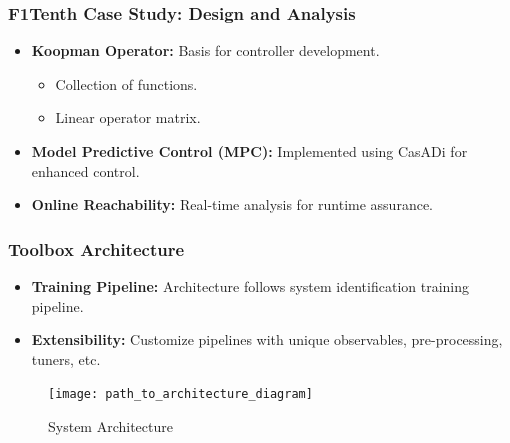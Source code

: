 \documentclass[shortpres,aspectratio=43]{beamer}
\begin{document}
\begin{frame}
\frametitle{F1Tenth Case Study: Design and Analysis}
\begin{itemize}
    \item<1-> \textbf{Koopman Operator:} Basis for controller development.
    \begin{itemize}
        \item Collection of functions.
        \item Linear operator matrix.
    \end{itemize}
    \item<2-> \textbf{Model Predictive Control (MPC):} Implemented using CasADi for enhanced control.
    \item<3-> \textbf{Online Reachability:} Real-time analysis for runtime assurance.
\end{itemize}
\end{frame}

\begin{frame}
\frametitle{Toolbox Architecture}
\begin{itemize}
    \item<1-> \textbf{Training Pipeline:} Architecture follows system identification training pipeline.
    \item<2-> \textbf{Extensibility:} Customize pipelines with unique observables, pre-processing, tuners, etc.
\end{itemize}
\begin{figure}
  \centering
  \texttt{[image: path\_to\_architecture\_diagram]} %
  \caption{System Architecture}
\end{figure}
\end{frame}
\end{document}
